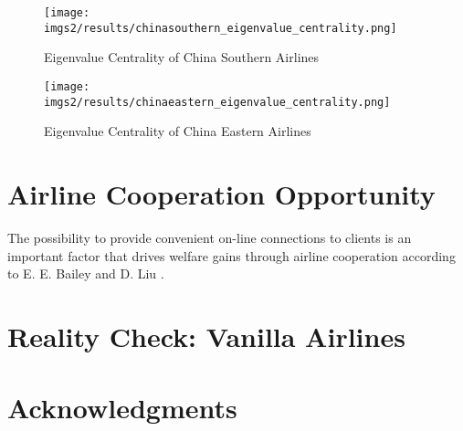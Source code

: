 \documentclass[twocolumn]{tum-article}
\begin{document}
\begin{figure}
        \centering
        \texttt{[image: imgs2/results/chinasouthern\_eigenvalue\_centrality.png]}
        \caption{
Eigenvalue Centrality of China Southern Airlines}
        \label{fig:chinasouthern_air_ec}
\end{figure}


\begin{figure}
        \centering
        \texttt{[image: imgs2/results/chinaeastern\_eigenvalue\_centrality.png]}
        \caption{
Eigenvalue Centrality of China Eastern Airlines}
        \label{fig:chinaeastern_air_ec}
\end{figure}


\section{Airline Cooperation Opportunity}

The possibility to provide convenient on-line connections to clients is an important factor that drives welfare gains through airline cooperation according to E. E. Bailey and D. Liu \cite{airline_consolidation_and_consumer_welfare}.

\section{Reality Check: Vanilla Airlines}


\section*{Acknowledgments}




\end{document}
